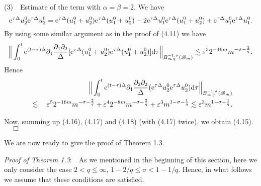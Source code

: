 \documentclass[11pt]{article}
\newcommand{\rmd}{\mbox{\rm d}}
\newcommand{\rme}{{\rm e}}
\begin{document}
  (3)\ \ Estimate of the term with $\alpha=\beta=2$. We have
$$
  \rme^{\tau\Delta}u_2^0\rme^{\tau\Delta}u_2^0=\rme^{\tau\Delta}(u_1^0+u_2^0)\rme^{\tau\Delta}(u_1^0+u_2^0)
  -2\rme^{\tau\Delta}u_1^0\rme^{\tau\Delta}(u_1^0+u_2^0)+\rme^{\tau\Delta}u_1^0\rme^{\tau\Delta}u_1^0.
$$
  By using some similar argument as in the proof of (4.11) we have
$$
  \Big\|\int_0^t\rme^{(t-\tau)\Delta}\partial_1\frac{\partial_1\partial_2}{\Delta}
  [\rme^{\tau\Delta}(u_1^0+u_2^0)\rme^{\tau\Delta}(u_1^0+u_2^0)]\rmd\tau\Big\|_{B^{-1,\sigma}_{\infty\,q}(\mathscr{B}_m)}
  \lesssim\varepsilon^5 2^{-16m}m^{-\sigma-\frac{2}{q}}.
$$
  Hence
\begin{eqnarray}
  &&\Big\|\int_0^t\rme^{(t-\tau)\Delta}\partial_1\frac{\partial_2\partial_2}{\Delta}
  (\rme^{\tau\Delta}u_2^0\rme^{\tau\Delta}u_2^0)\rmd\tau\Big\|_{B^{-1,\sigma}_{\infty\,q}(\mathscr{B}_m)}
\nonumber\\
  &\;\lesssim\;&\varepsilon^5 2^{-16m}m^{-\sigma-\frac{2}{q}}+\varepsilon^4 2^{-8m}m^{-\sigma-\frac{2}{q}}
  +\varepsilon^3 m^{1-\sigma-\frac{1}{q}}
  \lesssim\varepsilon^3 m^{1-\sigma-\frac{1}{q}}.
\end{eqnarray}

  Now, summing up (4.16), (4.17) and (4.18) (with (4.17) twice), we obtain (4.15). $\quad\Box$
\medskip

  We are now ready to give the proof of Theorem 1.3.
\medskip

  {\em Proof of Theorem 1.3}:\ \ As we mentioned in the beginning of this section, here we only consider the case $2<q\leqslant\infty$,
  $1-2/q\leqslant\sigma<1-1/q$. Hence, in what follows we assume that these conditions are satisfied.
\end{document}
